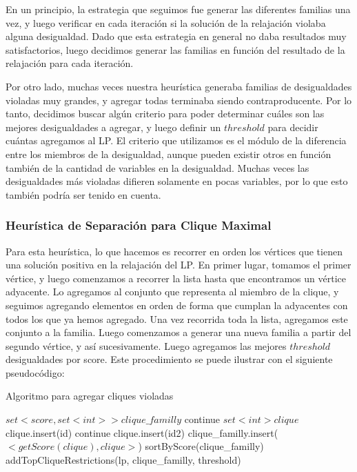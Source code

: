 En un principio, la estrategia que seguimos fue generar las diferentes familias una vez, y luego verificar en cada iteración si la solución de la relajación violaba alguna desigualdad. Dado que esta estrategia en general no daba resultados muy satisfactorios, luego decidimos generar las familias en función del resultado de la relajación para cada iteración.

Por otro lado, muchas veces nuestra heurística generaba familias de desigualdades violadas muy grandes, y agregar todas terminaba siendo contraproducente. Por lo tanto, decidimos buscar algún criterio para poder determinar cuáles son las mejores desigualdades a agregar, y luego definir un $threshold$ para decidir cuántas agregamos al LP. El criterio que utilizamos es el módulo de la diferencia entre los miembros de la desigualdad, aunque pueden existir otros en función también de la cantidad de variables en la desigualdad. Muchas veces las desigualdades más violadas difieren solamente en pocas variables, por lo que esto también podría ser tenido en cuenta.

\pagebreak

\subsubsection{Heurística de Separación para Clique Maximal}

Para esta heurística, lo que hacemos es recorrer en orden los vértices que tienen una solución positiva en la relajación del LP. En primer lugar, tomamos el primer vértice, y luego comenzamos a recorrer la lista hasta que encontramos un vértice adyacente. Lo agregamos al conjunto que representa al miembro de la clique, y seguimos agregando elementos en orden de forma que cumplan la adyacentes con todos los que ya hemos agregado. Una vez recorrida toda la lista, agregamos este conjunto a la familia. Luego comenzamos a generar una nueva familia a partir del segundo vértice, y así sucesivamente. Luego agregamos las mejores $threshold$ desigualdades por score. Este procedimiento se puede ilustrar con el siguiente pseudocódigo:

\begin{algorithm}
\caption{Algoritmo para agregar cliques violadas}
\begin{algorithmic}[1]
\State $set<score, set<int>> clique\_familly$
		\State continue
	\EndIf
	\State $set<int> clique$
	\State clique.insert(id)
			\State continue
		\EndIf
			\State clique.insert(id2)
		\EndIf
	\EndFor
		\State clique\_familly.insert($<getScore(clique), clique>$)
	\EndIf
\EndFor
\State sortByScore(clique\_familly)
\State addTopCliqueRestrictions(lp, clique\_familly, threshold)
\EndProcedure
\end{algorithmic}
\end{algorithm}

